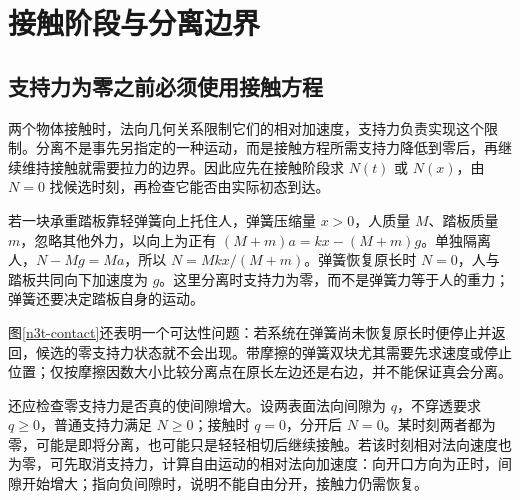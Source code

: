 \section{接触阶段与分离边界}
\subsection{支持力为零之前必须使用接触方程}
两个物体接触时，法向几何关系限制它们的相对加速度，支持力负责实现这个限制。分离不是事先另指定的一种运动，而是接触方程所需支持力降低到零后，再继续维持接触就需要拉力的边界。因此应先在接触阶段求 $N(t)$ 或 $N(x)$，由 $N=0$ 找候选时刻，再检查它能否由实际初态到达。

若一块承重踏板靠轻弹簧向上托住人，弹簧压缩量 $x>0$，人质量 $M$、踏板质量 $m$，忽略其他外力，以向上为正有 $(M+m)a=kx-(M+m)g$。单独隔离人，$N-Mg=Ma$，所以 $N=Mkx/(M+m)$。弹簧恢复原长时 $N=0$，人与踏板共同向下加速度为 $g$。这里分离时支持力为零，而不是弹簧力等于人的重力；弹簧还要决定踏板自身的运动。

图\ref{n3t-contact}还表明一个可达性问题：若系统在弹簧尚未恢复原长时便停止并返回，候选的零支持力状态就不会出现。带摩擦的弹簧双块尤其需要先求速度或停止位置；仅按摩擦因数大小比较分离点在原长左边还是右边，并不能保证真会分离。

还应检查零支持力是否真的使间隙增大。设两表面法向间隙为 $q$，不穿透要求 $q\ge0$，普通支持力满足 $N\ge0$；接触时 $q=0$，分开后 $N=0$。某时刻两者都为零，可能是即将分离，也可能只是轻轻相切后继续接触。若该时刻相对法向速度也为零，可先取消支持力，计算自由运动的相对法向加速度：向开口方向为正时，间隙开始增大；指向负间隙时，说明不能自由分开，接触力仍需恢复。

